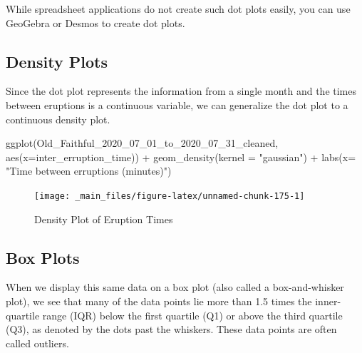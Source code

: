 \documentclass[
]{book}
\newenvironment{Shaded}{\begin{snugshade}}{\end{snugshade}}
\newcommand{\AttributeTok}[1]{\textcolor[rgb]{0.77,0.63,0.00}{#1}}
\newcommand{\FunctionTok}[1]{\textcolor[rgb]{0.00,0.00,0.00}{#1}}
\newcommand{\NormalTok}[1]{#1}
\newcommand{\SpecialCharTok}[1]{\textcolor[rgb]{0.00,0.00,0.00}{#1}}
\newcommand{\StringTok}[1]{\textcolor[rgb]{0.31,0.60,0.02}{#1}}
\theoremstyle{definition}
\theoremstyle{definition}
\theoremstyle{definition}
\theoremstyle{definition}
\theoremstyle{remark}
\begin{document}
While spreadsheet applications do not create such dot plots easily, you can use GeoGebra or Desmos to create dot plots.

\hypertarget{density-plots}{%
\subsection{Density Plots}\label{density-plots}}

Since the dot plot represents the information from a single month and the times between eruptions is a continuous variable, we can generalize the dot plot to a continuous density plot.

\begin{Shaded}
\begin{Highlighting}[]
\FunctionTok{ggplot}\NormalTok{(Old\_Faithful\_2020\_07\_01\_to\_2020\_07\_31\_cleaned, }\FunctionTok{aes}\NormalTok{(}\AttributeTok{x=}\NormalTok{inter\_erruption\_time)) }\SpecialCharTok{+} \FunctionTok{geom\_density}\NormalTok{(}\AttributeTok{kernel =} \StringTok{"gaussian"}\NormalTok{) }\SpecialCharTok{+} \FunctionTok{labs}\NormalTok{(}\AttributeTok{x=} \StringTok{"Time between erruptions (minutes)"}\NormalTok{)}
\end{Highlighting}
\end{Shaded}

\begin{figure}

{\centering \texttt{[image: \_main\_files/figure-latex/unnamed-chunk-175-1]} 

}

\caption{Density Plot of Eruption Times}\label{fig:unnamed-chunk-175}
\end{figure}

\hypertarget{box-plots}{%
\subsection{Box Plots}\label{box-plots}}

When we display this same data on a box plot (also called a box-and-whisker plot), we see that many of the data points lie more than 1.5 times the inner-quartile range (IQR) below the first quartile (Q1) or above the third quartile (Q3), as denoted by the dots past the whiskers. These data points are often called outliers.
\end{document}
